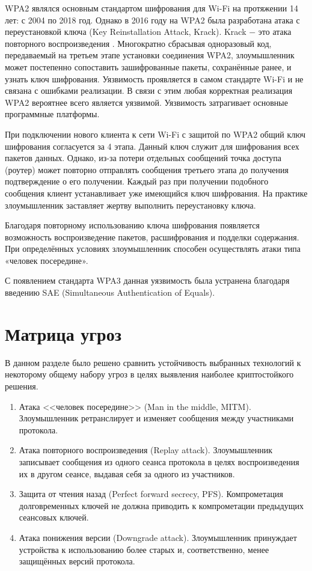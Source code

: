 	WPA2 являлся основным стандартом шифрования для Wi-Fi на протяжении 14 лет: с 2004 по 2018 год.
	Однако в 2016 году на WPA2 была разработана атака с переустановкой ключа (Key Reinstallation Attack, Krack).
	Krack $-$ это атака повторного воспроизведения \cite{cve-2017-13077}. Многократно сбрасывая одноразовый код, передаваемый 
	на третьем этапе установки соединения WPA2, злоумышленник может постепенно сопоставить зашифрованные 
	пакеты, сохранённые ранее, и узнать ключ шифрования.
	Уязвимость проявляется в самом стандарте Wi-Fi и не связана с ошибками реализации. В связи с этим любая
	корректная реализация WPA2 вероятнее всего является уязвимой. Уязвимость затрагивает основные 
	программные платформы.
	
	При подключении нового клиента к сети Wi-Fi с защитой по WPA2 общий ключ шифрования согласуется 
	за 4 этапа. Данный ключ служит для шифрования всех пакетов данных. Однако, из-за потери отдельных 
	сообщений точка доступа (роутер) может повторно отправлять сообщения третьего этапа до получения 
	подтверждение о его получении. Каждый раз при получении подобного сообщения клиент устанавливает 
	уже имеющийся ключ шифрования. На практике злоумышленник заставляет жертву выполнить переустановку
	ключа.
	
	Благодаря повторному использованию ключа шифрования появляется возможность воспроизведение пакетов, 
	расшифрования и подделки содержания. При определённых условиях злоумышленник способен осуществлять 
	атаки типа «человек посередине».
	
	С появлением стандарта WPA3 данная уязвимость была устранена благодаря введению SAE (Simultaneous 
	Authentication of Equals).
	
	
	\section{Матрица угроз}
	
	В данном разделе было решено сравнить устойчивость выбранных технологий к некоторому общему набору
	угроз в целях выявления наиболее криптостойкого решения.
	
	\begin{enumerate}
		\item Атака <<человек посередине>> (Man in the middle, MITM). Злоумышленник ретранслирует и 
		изменяет сообщения между участниками протокола.
		\item Атака повторного воспроизведения (Replay attack). Злоумышленник записывает сообщения
		из одного сеанса протокола в целях воспроизведения их в другом сеансе, выдавая себя за одного
		из участников.
		\item Защита от чтения назад (Perfect forward secrecy, PFS). Компрометация долговременных ключей 
		не должна приводить к компрометации предыдущих сеансовых ключей.
		\item Атака понижения версии (Downgrade attack). Злоумышленник принуждает устройства к
		использованию более старых и, соответственно, менее защищённых версий протокола.
	\end{enumerate}

